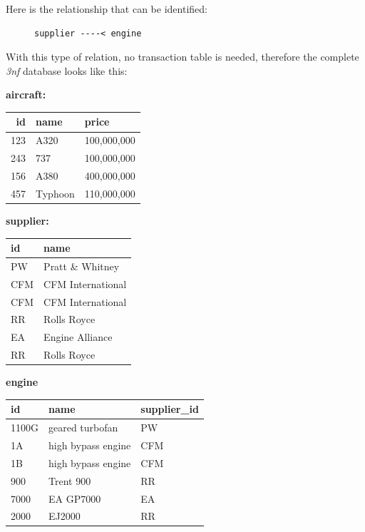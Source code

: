 \documentclass[9pt]{article}
\begin{document}
Here is the relationship that can be identified:

\begin{figure}[H]
\begin{verbatim}
supplier ----< engine
\end{verbatim}
\end{figure}

With this type of relation, no transaction table is needed, therefore the complete \emph{3nf} database looks like this:

\textbf{aircraft:}

\begin{center}
\begin{tabular}{rll}
\hline
id & name & price\\
\hline
123 & A320 & 100,000,000\\
243 & 737 & 100,000,000\\
156 & A380 & 400,000,000\\
457 & Typhoon & 110,000,000\\
\hline
\end{tabular}
\end{center}

\textbf{supplier:}

\begin{center}
\begin{tabular}{ll}
\hline
id & name\\
\hline
PW & Pratt \& Whitney\\
CFM & CFM International\\
CFM & CFM International\\
RR & Rolls Royce\\
EA & Engine Alliance\\
RR & Rolls Royce\\
\hline
\end{tabular}
\end{center}

\textbf{engine}

\begin{center}
\begin{tabular}{lll}
\hline
id & name & supplier\_id\\
\hline
1100G & geared turbofan & PW\\
1A & high bypass engine & CFM\\
1B & high bypass engine & CFM\\
900 & Trent 900 & RR\\
7000 & EA GP7000 & EA\\
2000 & EJ2000 & RR\\
\hline
\end{tabular}
\end{center}
\end{document}

